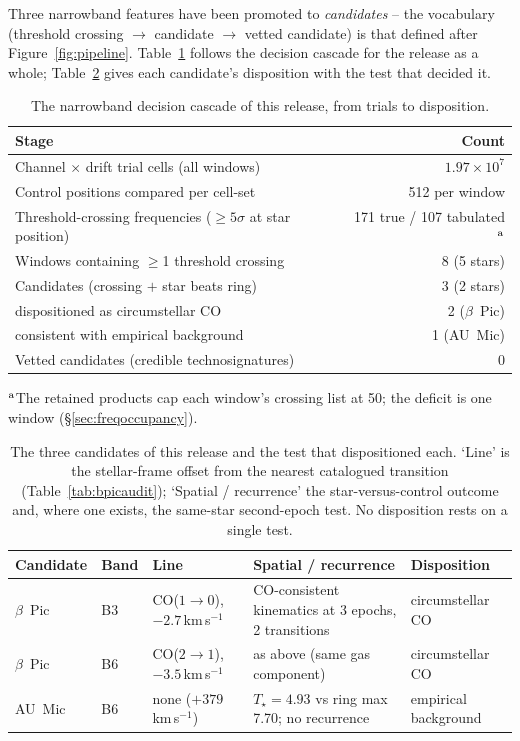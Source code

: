\documentclass{openjournal}
\begin{document}
Three narrowband features have been promoted to \emph{candidates} --
the vocabulary (threshold crossing $\rightarrow$ candidate $\rightarrow$
vetted candidate) is that defined after Figure~\ref{fig:pipeline}.
Table~\ref{tab:funnel} follows the decision cascade for the release
as a whole; Table~\ref{tab:candidates} gives each candidate's
disposition with the test that decided it.

\begin{table}
\centering
\small
\caption{The narrowband decision cascade of this release, from trials
to disposition.}
\label{tab:funnel}
\begin{tabular}{@{}lr@{}}
\hline
Stage & Count \\
\hline
Channel $\times$ drift trial cells (all windows) & $1.97\times10^{7}$ \\
Control positions compared per cell-set & 512 per window \\
Threshold-crossing frequencies ($\geq5\sigma$ at star position) & 171 true / 107 tabulated$^{\rm a}$ \\
Windows containing $\geq$1 threshold crossing & 8 (5 stars) \\
Candidates (crossing $+$ star beats ring) & 3 (2 stars) \\
\quad dispositioned as circumstellar CO & 2 ($\beta$~Pic) \\
\quad consistent with empirical background & 1 (AU~Mic) \\
Vetted candidates (credible technosignatures) & 0 \\
\hline
\end{tabular}
\parbox{\columnwidth}{\footnotesize $^{\rm a}$The retained products cap
each window's crossing list at 50; the deficit is one window
(\S\ref{sec:freqoccupancy}).}
\end{table}

\begin{table}
\centering
\small
\setlength{\tabcolsep}{4pt}
\caption{The three candidates of this release and the test that
dispositioned each. `Line' is the stellar-frame offset from the
nearest catalogued transition (Table~\ref{tab:bpicaudit}); `Spatial /
recurrence' the star-versus-control outcome and, where one exists,
the same-star second-epoch test. No disposition rests on a single
test.}
\label{tab:candidates}
\begin{tabular}{@{}lllll@{}}
\toprule
Candidate & Band & Line & Spatial / recurrence & Disposition \\
\midrule
$\beta$~Pic & B3 & CO($1{\to}0$), $-2.7$\,km\,s$^{-1}$ & CO-consistent kinematics at 3 epochs, 2 transitions & circumstellar CO \\
$\beta$~Pic & B6 & CO($2{\to}1$), $-3.5$\,km\,s$^{-1}$ & as above (same gas component) & circumstellar CO \\
AU~Mic & B6 & none ($+379$\,km\,s$^{-1}$) & $T_\star=4.93$ vs ring max 7.70; no recurrence & empirical background \\
\bottomrule
\end{tabular}
\end{table}
\end{document}
